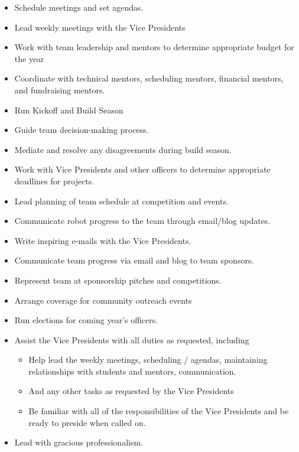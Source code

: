 \documentclass[12pt, a4paper]{article}
\begin{document}
\begin{itemize}
\item Schedule meetings and set agendas.
\item Lead weekly meetings with the Vice Presidents
\item Work with team leadership and mentors to determine appropriate budget for the year
\item Coordinate with technical mentors, scheduling mentors, financial mentors, and fundraising mentors.
\item Run Kickoff and Build Season
\item Guide team decision-making process.
\item Mediate and resolve any disagreements during build season.
\item Work with Vice Presidents and other officers to determine appropriate deadlines for projects.
\item Lead planning of team schedule at competition and events.
\item Communicate robot progress to the team through email/blog updates.
\item Write inspiring e-mails with the Vice Presidents.
\item Communicate team progress via email and blog to team sponsors.
\item Represent team at sponsorship pitches and competitions.
\item Arrange coverage for community outreach events
\item Run elections for coming year’s officers.  
\item Assist the Vice Presidents with all duties as requested, including
	\begin{itemize}
		\item Help lead the weekly meetings, scheduling / agendas, maintaining relationships with students and mentors, communication.
		\item And any other tasks as requested by the Vice Presidents
		\item Be familiar with all of the responsibilities of the Vice Presidents and be ready to preside when called on.
	\end{itemize}
\item Lead with gracious professionalism.
\end{itemize}
\end{document}
